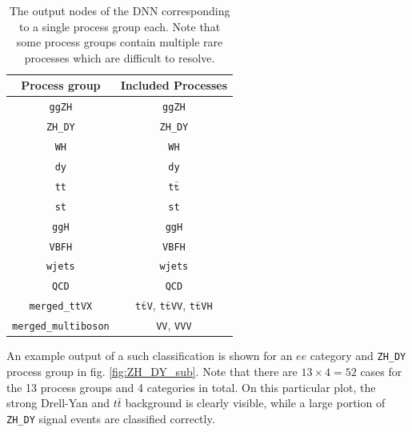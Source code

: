 \begin{table}[h!]
	\centering
	\begin{tabular}{cc}
		Process group & Included Processes \\
		\hline
		\texttt{ggZH} & \texttt{ggZH} \\
		\texttt{ZH\_DY} & \texttt{ZH\_DY} \\
		\texttt{WH} & \texttt{WH} \\
		\texttt{dy} & \texttt{dy} \\
		\texttt{tt} & \texttt{t}$\bar{\texttt{t}}$ \\
		\texttt{st} & \texttt{st} \\
		\texttt{ggH} & \texttt{ggH} \\
		\texttt{VBFH} & \texttt{VBFH} \\
		\texttt{wjets} & \texttt{wjets} \\
		\texttt{QCD} & \texttt{QCD} \\
		\texttt{merged\_ttVX} & \texttt{t}$\bar{\texttt{t}}$\texttt{V}, \texttt{t}$\bar{\texttt{t}}$\texttt{VV},  \texttt{t}$\bar{\texttt{t}}$\texttt{VH} \\
		\texttt{merged\_multiboson} & \texttt{VV}, \texttt{VVV} \\
	\end{tabular}
	\caption{The output nodes of the DNN corresponding to a single process group each. Note that some process groups contain multiple rare processes which are difficult to resolve.}
	\label{tab:DNN_outputs}
\end{table}

An example output of a such classification is shown for an $ee$ category and \texttt{ZH\_DY} process group in fig. \ref{fig:ZH_DY_sub}. Note that there are $13\times4 = 52$ cases for the 13 process groups and 4 categories in total. On this particular plot, the strong Drell-Yan and $t\bar{t}$ background is clearly visible, while a large portion of \texttt{ZH\_DY} signal events are classified correctly.


